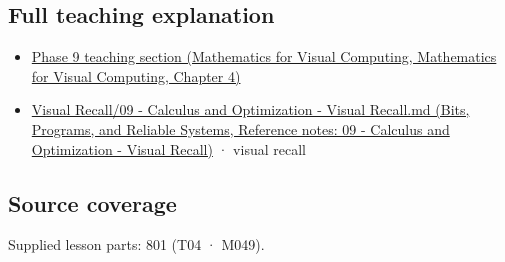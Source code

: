 \subsection{Full teaching explanation}\label{appendix-a59658325cd6-full-teaching-explanation}

\begin{itemize}
\tightlist
\item
  \href{../02-Mathematics-for-Visual-Computing/main.pdf\#nameddest=01-foundations-i-ch020-functions-limits-continuity-and-scalar-change}{Phase 9 teaching section (Mathematics for Visual Computing, Mathematics for Visual Computing, Chapter 4)}
\item
  \href{../01-Bits-Programs-and-Reliable-Systems/main.pdf\#nameddest=appendix-adf48f5dc5c1}{Visual Recall/09 - Calculus and Optimization - Visual Recall.md (Bits, Programs, and Reliable Systems, Reference notes: 09 - Calculus and Optimization - Visual Recall)} · visual recall
\end{itemize}

\subsection{Source coverage}\label{appendix-a59658325cd6-source-coverage}

Supplied lesson parts: 801 (T04 · M049).
